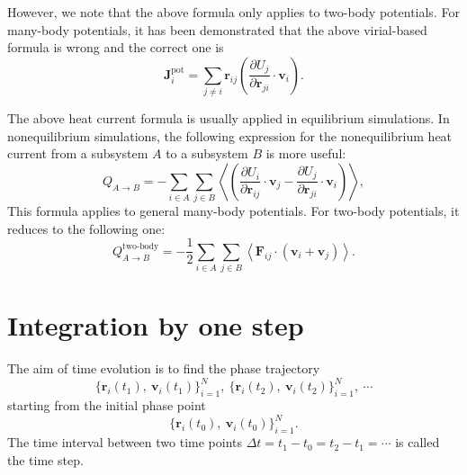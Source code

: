 \documentclass[12pt,a4paper]{report}
\newcommand{\vect}[1]{\boldsymbol{#1}}
\begin{document}
However, we note that the above formula only applies to two-body potentials. For many-body potentials, it has been demonstrated \cite{fan2015prb} that the above virial-based formula is wrong and the correct one is
\begin{equation}
\boxed{
\vect{J}^{\text{pot}}_i = \sum_{j \neq i} \vect{r}_{ij}
 \left(
 \frac{ \partial U_j} {\partial \vect{r}_{ji}} \cdot \vect{v}_i
 \right)}.
\end{equation}



The above heat current formula is usually applied in equilibrium simulations. In nonequilibrium simulations, the following expression for the nonequilibrium heat current \cite{fan2017prb} from a subsystem $A$ to a subsystem $B$ is more useful:
\begin{equation}
\label{equation:Q_AB}
\boxed{
Q_{A \rightarrow B} = -\sum_{i \in A} \sum_{j \in B}
\left\langle
\left(\frac{\partial U_i}{\partial \vect{r}_{ij}} \cdot \vect{v}_j
-\frac{\partial U_j}{\partial \vect{r}_{ji}} \cdot \vect{v}_i\right)
\right\rangle
},
\end{equation}
This formula applies to general many-body potentials. For two-body potentials, it reduces to the following one:
\begin{equation}
  Q_{A \rightarrow B}^{\text{two-body}} =
- \frac{1}{2} \sum_{i \in A} \sum_{j \in B}
\left\langle \vect{F}_{ij} \cdot (\vect{v}_i + \vect{v}_j) \right\rangle.
\end{equation}



\section{Integration by one step}

The aim of time evolution is to find the phase trajectory
\begin{equation}
\{ \vect{r}_i(t_1), ~\vect{v}_{i}(t_1)\}_{i=1}^N,~
\{ \vect{r}_i(t_2), ~\vect{v}_{i}(t_2)\}_{i=1}^N,~
\cdots
\end{equation}
starting from the initial phase point
\begin{equation}
\{ \vect{r}_i(t_0), ~\vect{v}_{i}(t_0)\}_{i=1}^N.
\end{equation}
The time interval between two time points $\Delta t=t_1-t_0=t_2-t_1=\cdots$ is called the time step.
\end{document}
